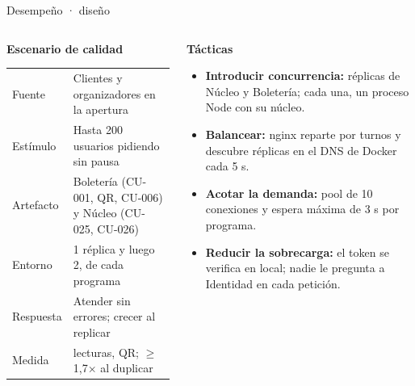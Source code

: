 \begin{frame}{Desempeño · diseño}
\small
\begin{columns}[T]
\begin{column}{0.47\textwidth}
\textbf{Escenario de calidad}\\[0.3em]
\begin{tabular}{@{}L{1.7cm}L{4.6cm}@{}}
Fuente & Clientes y organizadores en la apertura\\
Estímulo & Hasta 200 usuarios pidiendo sin pausa\\
Artefacto & Boletería (CU-001, QR, CU-006) y Núcleo (CU-025, CU-026)\\
Entorno & 1 réplica y luego 2, de cada programa\\
Respuesta & Atender sin errores; crecer al replicar\\
Medida & \leavevmode{} lecturas,  QR; $\geq$ 1,7$\times$ al duplicar\\
\end{tabular}
\end{column}
\begin{column}{0.5\textwidth}
\textbf{Tácticas}\\[0.3em]
\begin{itemize}\setlength\itemsep{0.3em}
\item \textbf{Introducir concurrencia:} réplicas de Núcleo y Boletería; cada una, un proceso Node
con su núcleo.
\item \textbf{Balancear:} nginx reparte por turnos y descubre réplicas en el DNS de Docker cada 5 s.
\item \textbf{Acotar la demanda:} pool de 10 conexiones y espera máxima de 3 s por programa.
\item \textbf{Reducir la sobrecarga:} el token se verifica en local; nadie le pregunta a Identidad
en cada petición.
\end{itemize}
\end{column}
\end{columns}
\end{frame}


